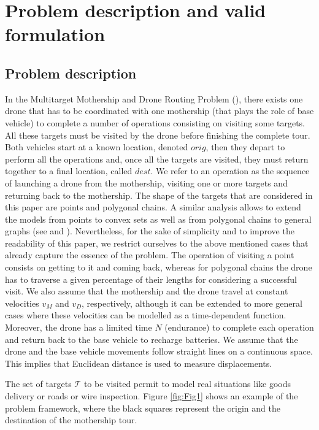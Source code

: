 \section{Problem description and valid formulation}\label{section:desc}
\subsection{Problem description}\label{subsection:desc}
In the Multitarget Mothership and Drone Routing Problem (\AMD), there exists one drone that has to be coordinated with one mothership (that plays the role of base vehicle) to complete a number of operations consisting on visiting some targets. All these targets must be visited by the drone before finishing the complete tour. Both vehicles start at a known location, denoted $orig$, then they depart to perform all the operations and, once all the targets are visited, they must return together to a final location, called $dest$. We refer to an operation as the sequence of launching a drone from the mothership, visiting one or more targets and returning back to the mothership. The shape of the targets that are considered in this paper are points and polygonal chains. A similar analysis allows to extend the models from points to convex sets as well as from polygonal chains to general graphs (see \cite{art:Amorosi2021} and \cite{art:Amorosi2021b}). Nevertheless, for the sake of simplicity and to improve the readability of this paper, we restrict ourselves to the above mentioned cases that already capture the essence of the problem. The operation of visiting a point consists on getting to it and coming back, whereas for polygonal chains the drone has to traverse a given percentage of their lengths for considering a successful visit. We also assume that the mothership and the drone travel at constant velocities $v_M$ and $v_D$, respectively, although it can be extended to more general cases where these velocities can be modelled as a time-dependent function. Moreover, the drone has a limited time $N$ (endurance) to complete each operation and return back to the base vehicle to recharge batteries. We assume that the drone and the base vehicle movements follow straight lines on a continuous space. This implies that Euclidean distance is used to measure displacements.


The set of targets $\mathcal{T}$ to be visited permit to model real situations like goods delivery or roads or wire inspection. Figure \ref{fig:Fig1} shows an example of the problem framework, where the black squares represent the origin and the destination of the mothership tour. 

